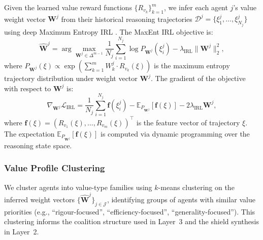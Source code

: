 \documentclass[12pt,a4paper]{article}
\newtheorem{theorem}{Theorem}[section]
\newcommand{\E}{\mathbb{E}}
\newcommand{\calJ}{\mathcal{J}}
\newcommand{\calD}{\mathcal{D}}
\newcommand{\bW}{\bm{W}}
\begin{document}
Given the learned value reward functions $\{R_{v_k}\}_{k=1}^m$, we infer each agent
$j$'s value weight vector $\bW^j$ from their historical reasoning trajectories
$\calD^j = \{\xi^j_1, \ldots, \xi^j_{N_j}\}$ using deep Maximum Entropy IRL
\citep{ziebart2008maximum,wulfmeier2015maximum}. The MaxEnt IRL objective is:
\begin{equation}
  \hat{\bW}^j = \arg\max_{\bW^j \in \Delta^{m-1}} \frac{1}{N_j} \sum_{i=1}^{N_j}
  \log P_{\bW^j}(\xi^j_i) - \lambda_{\mathrm{IRL}} \|\bW^j\|_2^2,
  \label{eq:maxent_irl}
\end{equation}
where $P_{\bW^j}(\xi) \propto \exp\!\left(\sum_{k=1}^m W^j_k \cdot R_{v_k}(\xi)
\right)$ is the maximum entropy trajectory distribution under weight vector $\bW^j$.
The gradient of the objective with respect to $\bW^j$ is:
\begin{equation}
  \nabla_{\bW^j} \mathcal{L}_{\mathrm{IRL}} = \frac{1}{N_j} \sum_{i=1}^{N_j}
  \bm{f}(\xi^j_i) - \E_{P_{\bW^j}}[\bm{f}(\xi)] - 2\lambda_{\mathrm{IRL}} \bW^j,
  \label{eq:maxent_gradient}
\end{equation}
where $\bm{f}(\xi) = (R_{v_1}(\xi), \ldots, R_{v_m}(\xi))^\top$ is the feature vector
of trajectory $\xi$. The expectation $\E_{P_{\bW^j}}[\bm{f}(\xi)]$ is computed via
dynamic programming over the reasoning state space.

\subsubsection{Value Profile Clustering}

We cluster agents into value-type families using $k$-means clustering on the inferred
weight vectors $\{\hat{\bW}^j\}_{j \in \calJ}$, identifying groups of agents with
similar value priorities (e.g., ``rigour-focused'', ``efficiency-focused'',
``generality-focused''). This clustering informs the coalition structure used in
Layer~3 and the shield synthesis in Layer~2.

\end{document}
